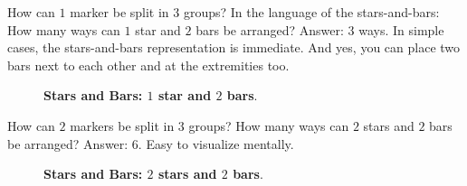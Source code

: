 \documentclass[12pt]{article}
\begin{document}
How can $1$ marker be split in $3$ groups? In the language of the stars-and-bars: How many ways can $1$ star and $2$ bars be arranged? Answer: $3$ ways. In simple cases, the stars-and-bars representation is immediate. And yes, you can place two bars next to each other and at the extremities too. 
\begin{figure}[hptb]
\begin{minipage}[b]{\textwidth}
\centering
{}
\caption{\textbf{Stars and Bars: $1$ star and $2$ bars}.
\label{fig:stars:bars:1}}
\end{minipage}
\end{figure}

How can $2$ markers be split in $3$ groups? How many ways can $2$ stars and $2$ bars be arranged? Answer: $6$. Easy to visualize mentally.
\begin{figure}[hptb]
\begin{minipage}[b]{\textwidth}
\centering
{}
\caption{\textbf{Stars and Bars: $2$ stars and $2$ bars}.
\label{fig:stars:bars:2}}
\end{minipage}
\end{figure}
\end{document}
